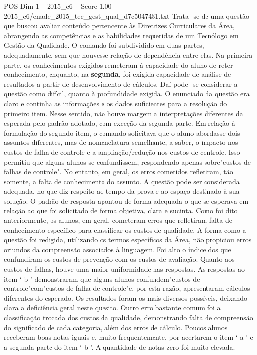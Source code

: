 \begin{textsample}{POS Dim 1 – 2015\_c6 – Score 1.00 – 2015\_c6/enade\_2015\_tec\_gest\_qual\_d7c5047481.txt}
Trata -se de uma questão que buscou avaliar conteúdo pertencente às Diretrizes Curriculares da Área, abrangendo as competências e as habilidades requeridas de um Tecnólogo em Gestão da Qualidade.
O comando foi subdividido em duas partes, adequadamente, sem que houvesse relação de dependência entre elas.
Na primeira parte, os conhecimentos exigidos remeteram à capacidade do aluno de reter conhecimento, enquanto, na \textbf{segunda}, foi exigida capacidade de análise de resultados a partir de desenvolvimento de cálculos.
Daí pode -se considerar a questão como difícil, quanto à profundidade exigida.
O enunciado da questão era claro e continha as informações e os dados suficientes para a resolução do primeiro item.
Nesse sentido, não houve margem a interpretações diferentes da esperada pelo padrão adotado, com exceção da segunda parte.
Em relação à formulação do segundo item, o comando solicitava que o aluno abordasse dois assuntos diferentes, mas de nomenclatura semelhante, a saber, o impacto nos custos de falha de controle e a ampliação/redução nos custos de controle.
Isso permitiu que alguns alunos se confundissem, respondendo apenas sobre"custos de falhas de controle".
No entanto, em geral, os erros cometidos refletiram, tão somente, a falta de conhecimento do assunto.
A questão pode ser considerada adequada, no que diz respeito ao tempo da prova e ao espaço destinado à sua solução.
O padrão de resposta apontou de forma adequada o que se esperava em relação ao que foi solicitado de forma objetiva, clara e sucinta.
Como foi dito anteriormente, os alunos, em geral, cometeram erros que refletiram falta de conhecimento específico para classificar os custos de qualidade.
A forma como a questão foi redigida, utilizando os termos específicos da Área, não propiciou erros oriundos da compreensão associados à linguagem.
Foi alto o índice dos que confundiram os custos de prevenção com os custos de avaliação.
Quanto aos custos de falhas, houve uma maior uniformidade nas respostas.
As respostas ao item ‘ b ’ demonstraram que alguns alunos confundem"custos de controle"com"custos de falha de controle"e, por esta razão, apresentaram cálculos diferentes do esperado.
Os resultados foram os mais diversos possíveis, deixando clara a deficiência geral neste quesito.
Outro erro bastante comum foi a classificação trocada dos custos da qualidade, demonstrando falta de compreensão do significado de cada categoria, além dos erros de cálculo.
Poucos alunos receberam boas notas iguais e, muito frequentemente, por acertarem o item ‘ a ’ e a segunda parte do item ‘ b ’.
A quantidade de notas zero foi muito elevada.

\end{textsample}
